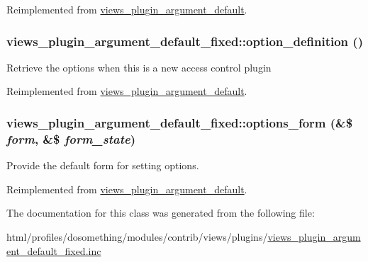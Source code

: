 Reimplemented from \hyperlink{classviews__plugin__argument__default_a8e67864f4a1ce20b12bc82afe1acd255}{views\_\-plugin\_\-argument\_\-default}.\hypertarget{classviews__plugin__argument__default__fixed_a6a0c87651155c020fc3b00c049db3add}{
\subsubsection[{option\_\-definition}]{\setlength{\rightskip}{0pt plus 5cm}views\_\-plugin\_\-argument\_\-default\_\-fixed::option\_\-definition ()}}
\label{classviews__plugin__argument__default__fixed_a6a0c87651155c020fc3b00c049db3add}
Retrieve the options when this is a new access control plugin 

Reimplemented from \hyperlink{classviews__plugin__argument__default_ac3a58218880857bc009d4617fab2241b}{views\_\-plugin\_\-argument\_\-default}.\hypertarget{classviews__plugin__argument__default__fixed_a77c335bd34999e6e241193dbc25f6a8c}{
\subsubsection[{options\_\-form}]{\setlength{\rightskip}{0pt plus 5cm}views\_\-plugin\_\-argument\_\-default\_\-fixed::options\_\-form (\&\$ {\em form}, \/  \&\$ {\em form\_\-state})}}
\label{classviews__plugin__argument__default__fixed_a77c335bd34999e6e241193dbc25f6a8c}
Provide the default form for setting options. 

Reimplemented from \hyperlink{classviews__plugin__argument__default_a9bc59dae448f4c35d422bc54d0879930}{views\_\-plugin\_\-argument\_\-default}.

The documentation for this class was generated from the following file:\begin{DoxyCompactItemize}
\item 
html/profiles/dosomething/modules/contrib/views/plugins/\hyperlink{views__plugin__argument__default__fixed_8inc}{views\_\-plugin\_\-argument\_\-default\_\-fixed.inc}\end{DoxyCompactItemize}
